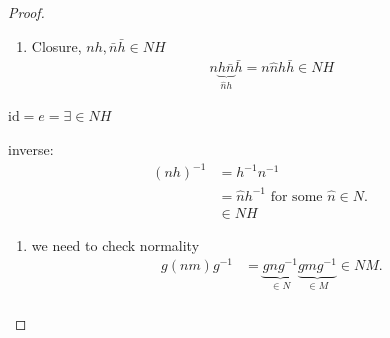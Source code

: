 \begin{proof}

~

\begin{enumerate}
\def\labelenumi{\roman{enumi}.}
\tightlist
\item
  Closure, \(nh, \bar{n} \bar{h} \in NH\)
  \begin{align*}
   n \underbrace{h \bar{n}}_{\hat{n} h} \bar{h} = n \hat{n} h \bar{h} \in NH
  \end{align*}
\end{enumerate}

\(\text{id} = e = \exists \in NH\)

inverse:
\begin{align*}
    (nh)^{-1} &= h^{-1} n^{-1} \\
    &= \hat{n} h^{-1} \text{ for some } \hat{n} \in N. \\
    &\in NH
\end{align*}

\begin{enumerate}
\def\labelenumi{\roman{enumi}.}
\setcounter{enumi}{1}
\tightlist
\item
  we need to check normality
  \begin{align*}
  g (nm) g^{-1} &= \underbrace{g n g^{-1}}_{\in N} \underbrace{g m g^{-1}}_{\in M} \in NM.\\
  \end{align*}
\end{enumerate}

\end{proof}
